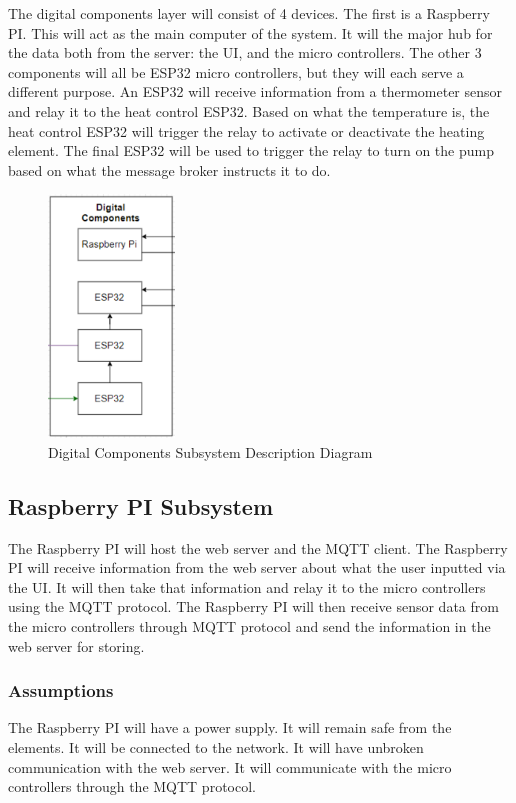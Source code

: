 The digital components layer will consist of 4 devices. The first is a Raspberry
PI. This will act as the main computer of the system. It will the major hub for
the data both from the server: the UI, and the micro controllers. The other 3
components will all be ESP32 micro controllers, but they will each serve a
different purpose. An ESP32 will receive information from a thermometer sensor
and relay it to the heat control ESP32. Based on what the temperature is, the
heat control ESP32 will trigger the relay to activate or deactivate the heating
element. The final ESP32 will be used to trigger the relay to turn on the pump
based on what the message broker instructs it to do.   

\begin{figure}[h!]
	\centering
 	\includegraphics[width=0.30\textwidth]{images/digital_components.png}
  \caption{Digital Components Subsystem Description Diagram}
\end{figure}

\subsection{Raspberry PI Subsystem}
The Raspberry PI will host the web server and the MQTT client. The Raspberry PI will
receive information from the web server about what the user inputted via the UI.
It will then take that information and relay it to the micro controllers using
the MQTT protocol. The Raspberry PI will then receive sensor data from the
micro controllers through MQTT protocol and send the information in the web
server for storing. 

\subsubsection{Assumptions}
The Raspberry PI will have a power supply. It will remain safe from the elements. It
will be connected to the network. It will have unbroken communication with the
web server. It will communicate with the micro controllers through the MQTT protocol.


